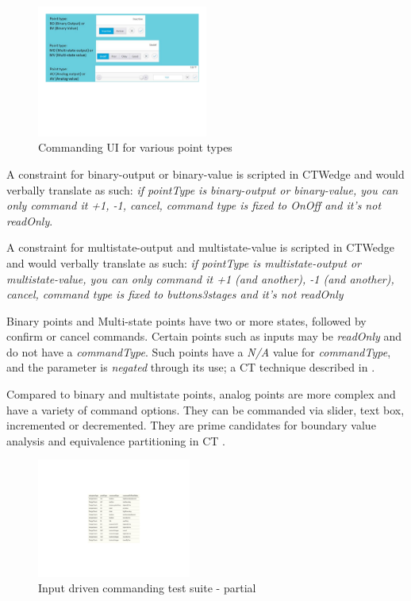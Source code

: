 \documentclass[conference]{IEEEtran}
\begin{document}
	\begin{figure}[!t]
		\includegraphics[width=0.50\textwidth,]{modelCommanding.pdf}
		\caption{Commanding UI for various point types}
		\label{fig:modelCommanding}
	\end{figure} 

	A constraint for binary-output or binary-value is scripted in CTWedge and would verbally translate as such:
	\textit{if pointType is binary-output or binary-value, you can only command it +1, -1, cancel, command type is fixed to OnOff and it's not readOnly}.
	
	A constraint for multistate-output and multistate-value is scripted in CTWedge and would verbally translate as such:
	\textit{if pointType is multistate-output or multistate-value, you can only command it +1 (and another), -1 (and another), cancel, command type is fixed to buttons3stages and it's not readOnly}

	Binary points and Multi-state points have two or more states, followed by confirm or cancel commands. 
	Certain points such as inputs may be \textit{readOnly} and do not have a \textit{commandType}. Such points have a \textit{N/A} value for \textit{commandType}, and the parameter is \textit{negated} through its use; a CT technique described in \cite{segall2012common}.	

	Compared to binary and multistate points, analog points are more complex and have a variety of command options.
	They can be commanded via slider, text box, incremented or decremented. 
	They are prime candidates for boundary value analysis and equivalence partitioning in CT \cite{segall2012common}.

	\begin{figure}[!t]
		\includegraphics[width=0.45\textwidth,]{csvOutputCommanding.pdf}
		\caption{Input driven commanding test suite - partial}
		\label{fig:csvOutputCommanding}
	\end{figure}
\end{document}
